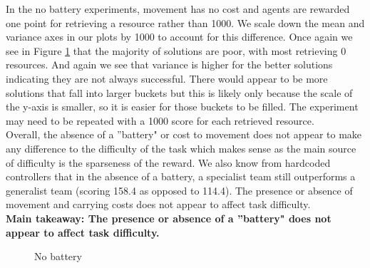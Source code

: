 \documentclass[12pt]{article}
\begin{document}
In the no battery experiments, movement has no cost and agents are rewarded one point for retrieving a resource rather than 1000. We scale down the mean and variance axes in our plots by 1000 to account for this difference. Once again we see in Figure \ref{fig:no_battery} that the majority of solutions are poor, with most retrieving 0 resources. And again we see that variance is higher for the better solutions indicating they are not always successful. There would appear to be more solutions that fall into larger buckets but this is likely only because the scale of the y-axis is smaller, so it is easier for those buckets to be filled. The experiment may need to be repeated with a 1000 score for each retrieved resource.\\

Overall, the absence of a ''battery" or cost to movement does not appear to make any difference to the difficulty of the task which makes sense as the main source of difficulty is the sparseness of the reward. We also know from hardcoded controllers that in the absence of a battery, a specialist team still outperforms a generalist team (scoring 158.4 as opposed to 114.4). The presence or absence of movement and carrying costs does not appear to affect task difficulty.\\

\textbf{Main takeaway: The presence or absence of a ''battery" does not appear to affect task difficulty.}

\begin{figure}[!tbp]
  \centering
  \hfill
  \hfill
  
  \caption{No battery}
  \label{fig:no_battery}
\end{figure}
\end{document}
